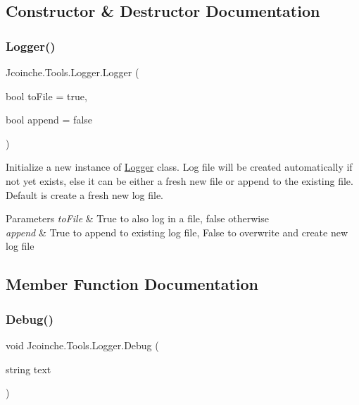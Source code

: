 \subsection{Constructor \& Destructor Documentation}
\mbox{\label{class_jcoinche_1_1_tools_1_1_logger_aaa424db2ffd03c2d6c3239d54b15d205}} 
\subsubsection{\texorpdfstring{Logger()}{Logger()}}
{\footnotesize\ttfamily Jcoinche.\+Tools.\+Logger.\+Logger (\begin{DoxyParamCaption}\item[{bool}]{to\+File = {\ttfamily true},  }\item[{bool}]{append = {\ttfamily false} }\end{DoxyParamCaption})\hspace{0.3cm}{\ttfamily [inline]}}



Initialize a new instance of \hyperlink{class_jcoinche_1_1_tools_1_1_logger}{Logger} class. Log file will be created automatically if not yet exists, else it can be either a fresh new file or append to the existing file. Default is create a fresh new log file. 


\begin{DoxyParams}{Parameters}
{\em to\+File} & True to also log in a file, false otherwise\\
\hline
{\em append} & True to append to existing log file, False to overwrite and create new log file\\
\hline
\end{DoxyParams}


\subsection{Member Function Documentation}
\mbox{\label{class_jcoinche_1_1_tools_1_1_logger_a06d15c16b2cd42db50515acabb6a0e4b}} 
\subsubsection{\texorpdfstring{Debug()}{Debug()}}
{\footnotesize\ttfamily void Jcoinche.\+Tools.\+Logger.\+Debug (\begin{DoxyParamCaption}\item[{string}]{text }\end{DoxyParamCaption})\hspace{0.3cm}{\ttfamily [inline]}}



